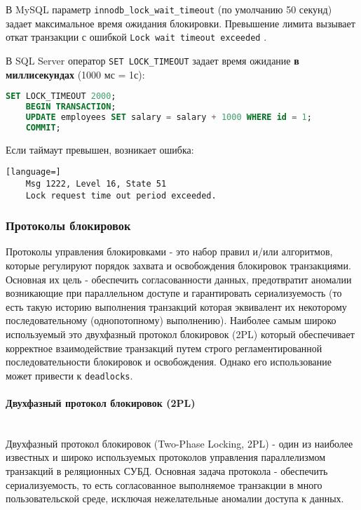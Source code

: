 В MySQL параметр \texttt{innodb\_lock\_wait\_timeout} (по умолчанию 50 секунд) задает максимальное время ожидания блокировки. Превышение лимита вызывает откат транзакции с ошибкой \texttt{Lock wait timeout exceeded} \autocite[§17.14]{Mysqldoc4}.

В SQL Server оператор \texttt{SET LOCK\_TIMEOUT} \autocite{MicrosoftLearnSQLserverSetLockTout} задает время ожидание \textbf{в миллисекундах} (1000 мс = 1с):
\begin{lstlisting}[language=SQL]
    SET LOCK_TIMEOUT 2000;
    BEGIN TRANSACTION;
    UPDATE employees SET salary = salary + 1000 WHERE id = 1;
    COMMIT;
\end{lstlisting}
Если таймаут превышен, возникает ошибка:
\begin{lstlisting}[language=]
    Msg 1222, Level 16, State 51
    Lock request time out period exceeded.    
\end{lstlisting}


\subsubsection{Протоколы блокировок}

Протоколы управления блокировками - это набор правил и/или алгоритмов, которые регулируют порядок захвата и освобождения блокировок транзакциями. Основная их цель - обеспечить согласованности данных, предотвратит аномалии возникающие при параллельном доступе и гарантировать сериализуемость (то есть такую историю выполнения транзакций которая эквивалент их некоторому последовательному (однопотопному) выполнению).
Наиболее самым широко используемый это двухфазный протокол блокировок (2PL) который обеспечивает корректное взаимодействие транзакций путем строго регламентированной последовательности блокировок и освобождения. Однако его использование может привести к \texttt{deadlocks}.


\paragraph{Двухфазный протокол блокировок (2PL)} ~\\


Двухфазный протокол блокировок (Two-Phase Locking, 2PL) - один из наиболее известных и широко используемых протоколов управления параллелизмом транзакций в реляционных СУБД. Основная задача протокола - обеспечить сериализуемость, то есть согласованное выполняемое транзакции в много пользовательской среде, исключая нежелательные аномалии доступа к данных.

